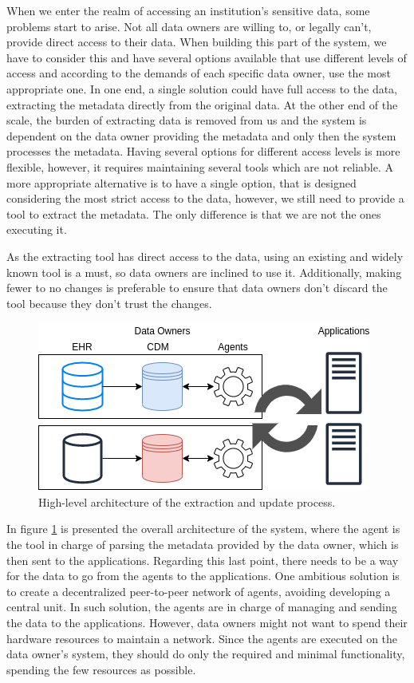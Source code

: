 When we enter the realm of accessing an institution's sensitive data, some problems start to arise.
Not all data owners are willing to, or legally can't, provide direct access to their data.
When building this part of the system, we have to consider this and have several options available that use different levels of access and according to the demands of each specific data owner, use the most appropriate one.
In one end, a single solution could have full access to the data, extracting the metadata directly from the original data.
At the other end of the scale, the burden of extracting data is removed from us and the system is dependent on the data owner providing the metadata and only then the system processes the metadata.
Having several options for different access levels is more flexible, however, it requires maintaining several tools which are not reliable.
A more appropriate alternative is to have a single option, that is designed considering the most strict access to the data, however, we still need to provide a tool to extract the metadata.
The only difference is that we are not the ones executing it.

As the extracting tool has direct access to the data, using an existing and widely known tool is a must, so data owners are inclined to use it.
Additionally, making fewer to no changes is preferable to ensure that data owners don't discard the tool because they don't trust the changes.

\begin{figure}[h]
    \center
    \includegraphics[width=.6\textwidth]{overall-arch}
    \caption{High-level architecture of the extraction and update process.}
    \label{fig:overall-arch}
\end{figure}

In figure \ref{fig:overall-arch} is presented the overall architecture of the system, where the agent is the tool in charge of parsing the metadata provided by the data owner, which is then sent to the applications.
Regarding this last point, there needs to be a way for the data to go from the agents to the applications.
One ambitious solution is to create a decentralized peer-to-peer network of agents, avoiding developing a central unit.
In such solution, the agents are in charge of managing and sending the data to the applications.
However, data owners might not want to spend their hardware resources to maintain a network.
Since the agents are executed on the data owner's system, they should do only the required and minimal functionality, spending the few resources as possible.

